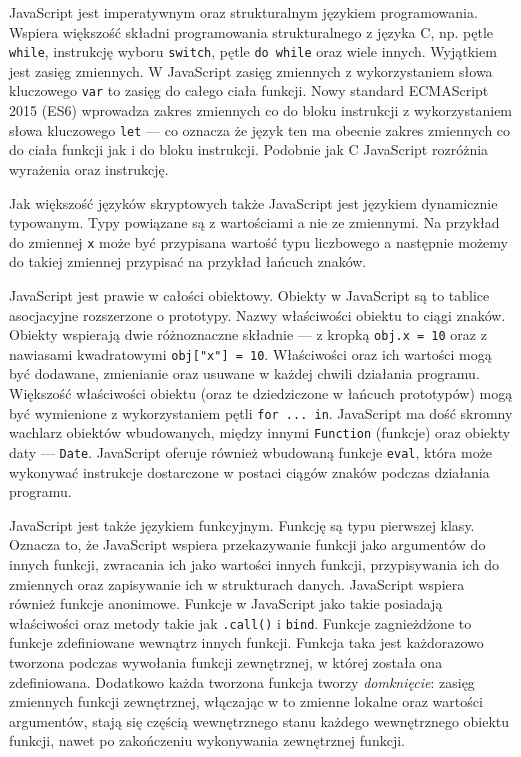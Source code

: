JavaScript jest imperatywnym oraz strukturalnym językiem programowania. Wspiera większość składni programowania strukturalnego z języka C, np. pętle \verb|while|, instrukcję wyboru \verb|switch|, pętle \verb|do while| oraz wiele innych. Wyjątkiem jest zasięg zmiennych. W JavaScript zasięg zmiennych z wykorzystaniem słowa kluczowego \verb|var| to zasięg do całego ciała funkcji. Nowy standard ECMAScript 2015 (ES6) wprowadza zakres zmiennych co do bloku instrukcji z wykorzystaniem słowa kluczowego \verb|let| --- co oznacza że język ten ma obecnie zakres zmiennych co do ciała funkcji jak i do bloku instrukcji. Podobnie jak C JavaScript rozróżnia wyrażenia oraz instrukcję\cite{jsWiki}. 

Jak większość języków skryptowych także JavaScript jest językiem dynamicznie typowanym. Typy powiązane są z wartościami a nie ze zmiennymi. Na przykład do zmiennej \verb|x| może być przypisana wartość typu liczbowego a następnie możemy do takiej zmiennej przypisać na przykład łańcuch znaków\cite{jsWiki}. 

JavaScript jest prawie w całości obiektowy. Obiekty w JavaScript są to tablice asocjacyjne rozszerzone o prototypy. Nazwy właściwości obiektu to ciągi znaków. Obiekty wspierają dwie różnoznaczne składnie --- z kropką \verb|obj.x = 10| oraz z nawiasami kwadratowymi \verb|obj["x"] = 10|. Właściwości oraz ich wartości mogą być dodawane, zmienianie oraz usuwane w każdej chwili działania programu. Większość właściwości obiektu (oraz te dziedziczone w łańcuch prototypów) mogą być wymienione z wykorzystaniem pętli \verb|for ... in|. JavaScript ma dość skromny wachlarz obiektów wbudowanych, między innymi \verb|Function| (funkcje) oraz obiekty daty --- \verb|Date|. JavaScript oferuje również wbudowaną funkcje \verb|eval|, która może wykonywać instrukcje dostarczone w postaci ciągów znaków podczas działania programu\cite{jsWiki}. 

JavaScript jest także językiem funkcyjnym. Funkcję są typu pierwszej klasy. Oznacza to, że JavaScript wspiera przekazywanie funkcji jako argumentów do innych funkcji, zwracania ich jako wartości innych funkcji, przypisywania ich do zmiennych oraz zapisywanie ich w strukturach danych. JavaScript wspiera również funkcje anonimowe\cite{fcfunctionWiki}. Funkcje w JavaScript jako takie posiadają właściwości oraz metody takie jak \verb|.call()| i \verb|bind|. Funkcje zagnieżdżone to funkcje zdefiniowane wewnątrz innych funkcji. Funkcja taka jest każdorazowo tworzona podczas wywołania funkcji zewnętrznej, w której została ona zdefiniowana. Dodatkowo każda tworzona funkcja tworzy \emph{domknięcie}: zasięg zmiennych funkcji zewnętrznej, włączając w to zmienne lokalne oraz wartości argumentów, stają się częścią wewnętrznego stanu każdego wewnętrznego obiektu funkcji, nawet po zakończeniu wykonywania zewnętrznej funkcji\cite{jsWiki}.

